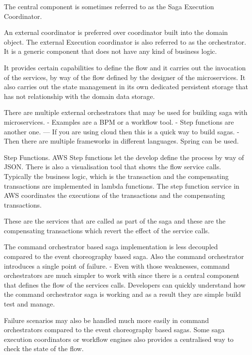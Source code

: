 \documentclass[a4paper, 11pt]{book}
\begin{document}
    The central component is sometimes referred to as the Saga Execution Coordinator.

    An external coordinator is preferred over coordinator built into the domain object.
    The external Execution coordinator is also referred to as the orchestrator.
    It is a generic component that does not have any kind of business logic.

    It provides certain capabilities to define the flow and it carries out the invocation of the services, by way of the flow defined by the designer of the microservices.
    It also carries out the state management in its own dedicated persistent storage that has not relationship with the domain data storage.

    There are multiple external orchestrators that may be used for building saga with microservices.
    - Examples are a BPM or a workflow tool.
    - Step functions are another one.
    --- If you are using cloud then this is a quick way to build sagas.
    - Then there are multiple frameworks in different languages. Spring can be used.

    Step Functions.
    AWS Step functions let the develop define the process by way of JSON.
    There is also a visualisation tool that shows the flow service calls.
    Typically the business logic, which is the transaction and the compensating transactions are implemented in lambda functions.
    The step function service in AWS coordinates the executions of the transactions and the compensating transactions.

    These are the services that are called as part of the saga and these are the compensating transactions which revert the effect of the service calls.

    The command orchestrator based saga implementation is less decoupled compared to the event choreography based saga.
    Also the command orchestrator introduces a single point of failure.
    - Even with those weaknesses, command orchestrators are much simpler to work with since there is a central component that defines the flow of the services calls.
    Developers can quickly understand how the command orchestrator saga is working and as a result they are simple build test and manage.

    Failure scenarios may also be handled much more easily in command orchestrators compared to the event choreography based sagas.
    Some saga execution coordinators or workflow engines also provides a centralised way to check the state of the flow.
\end{document}
